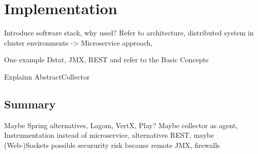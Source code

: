 \chapter{Implementation}

Introduce software stack, why used? Refer to architecture,
distributed system in cluster environments -> Microservice approach,

One example Dstat, JMX, REST and refer to the Basic Concepts

Explainn AbstractCollector

%


\section{Summary}

Maybe Spring alternatives, Lagom, VertX, Play?
Maybe collector as agent, Instrumentation instead of microservice, alternatives REST, maybe (Web-)Sockets
possible secururity risk because remote JMX, firewalls